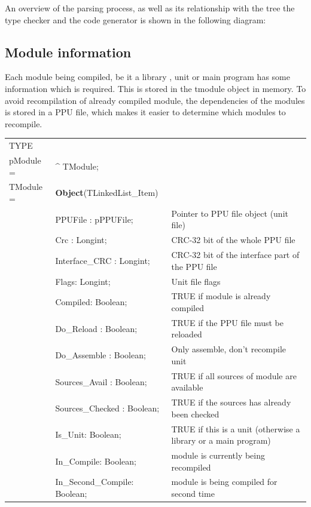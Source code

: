 \documentclass [a4paper,12pt]{article}
\begin{document}
An overview of the parsing process, as well as its relationship with the
tree the type checker and the code generator is shown in the following
diagram:

\subsection{Module information}
\label{subsec:module}

Each module being compiled, be it a library , unit or main program has some
information which is required. This is stored in the tmodule object in
memory. To avoid recompilation of already compiled module, the dependencies
of the modules is stored in a PPU file, which makes it easier to determine
which modules to recompile.

\begin{longtable}{|l@{\extracolsep{\fill}}lp{6cm}|}
\hline
\endhead
\hline
\endfoot
\textsf{TYPE}& & \\
\xspace pModule = & \^{}  TModule; & \\
\xspace \textsf{TModule} = & \textbf{Object}(TLinkedList\_Item) & \\
&\textsf{PPUFile : pPPUFile;}& Pointer to PPU file object (unit file) \\
&\textsf{Crc : Longint;}& CRC-32 bit of the whole PPU file \\
&\textsf{Interface{\_}CRC : Longint;}& CRC-32 bit of the interface part of the PPU file \\
&\textsf{Flags: Longint;}& Unit file flags \\
&\textsf{Compiled: Boolean;}& TRUE if module is already compiled \\
&\textsf{Do{\_}Reload : Boolean;}   & TRUE if the PPU file must be reloaded \\
&\textsf{Do{\_}Assemble : Boolean;} & Only assemble, don't recompile unit \\
&\textsf{Sources{\_}Avail : Boolean;}   & TRUE if all sources of module are available \\
&\textsf{Sources{\_}Checked : Boolean;} & TRUE if the sources has already been checked \\
&\textsf{Is{\_}Unit: Boolean;}      & TRUE if this is a unit (otherwise a library or a main program) \\
&\textsf{In{\_}Compile: Boolean;}   & module is currently being recompiled \\
&\textsf{In{\_}Second{\_}Compile: Boolean;}& module is being compiled for second time \\

\end{longtable}
\end{document}
